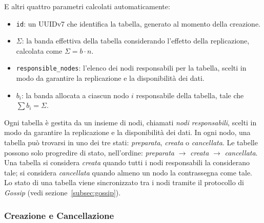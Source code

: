 E altri quattro parametri calcolati automaticamente:
\begin{itemize}
    \item \texttt{id}: un UUIDv7 che identifica la tabella, generato al momento della creazione.
    \item $\Sigma$: la banda effettiva della tabella considerando l'effetto della replicazione, calcolata come $\displaystyle \Sigma = b \cdot n$.
    \item \texttt{responsible\_nodes}: l'elenco dei nodi responsabili per la tabella, scelti in modo da garantire la replicazione e la disponibilità dei dati.
    \item $b_i$: la banda allocata a ciascun nodo $i$ responsabile della tabella, tale che $\displaystyle \sum b_i = \Sigma$.
\end{itemize}

Ogni tabella è gestita da un insieme di nodi, chiamati \emph{nodi responsabili}, scelti in modo da garantire la replicazione e la disponibilità dei dati.
In ogni nodo, una tabella può trovarsi in uno dei tre stati: \emph{preparata}, \emph{creata} o \emph{cancellata}.
Le tabelle possono solo progredire di stato, nell'ordine: \emph{preparata} $\rightarrow$ \emph{creata} $\rightarrow$ \emph{cancellata}.
Una tabella si considera \emph{creata} quando tutti i nodi responsabili la considerano tale; si considera \emph{cancellata} quando almeno un nodo la contrassegna come tale.
Lo stato di una tabella viene sincronizzato tra i nodi tramite il protocollo di \emph{Gossip} (vedi sezione~\ref{subsec:gossip}).

\subsubsection{Creazione e Cancellazione}
\label{subsubsec:creazione-cancellazione}

